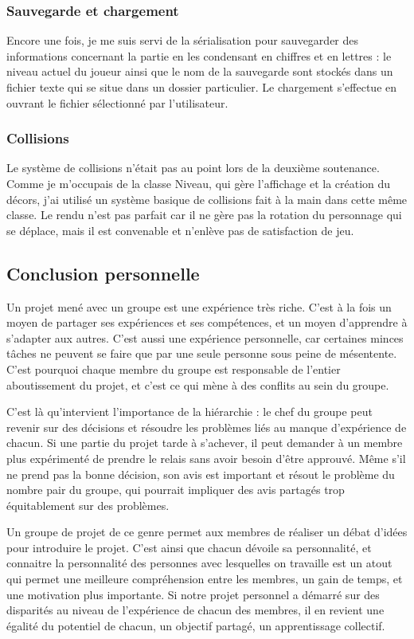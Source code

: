 \documentclass[12pt]{article}
\begin{document}
\subsubsection {Sauvegarde et chargement} 
Encore une fois, je me suis servi de la sérialisation pour sauvegarder des informations concernant la partie en les condensant en chiffres et en lettres : le niveau actuel du joueur ainsi que le nom de la sauvegarde sont stockés dans un fichier texte qui se situe dans un dossier particulier. Le chargement s'effectue en ouvrant le fichier sélectionné par l'utilisateur. 

\subsubsection {Collisions} 
Le système de collisions n'était pas au point lors de la deuxième soutenance. Comme je m'occupais de la classe Niveau, qui gère l'affichage et la création du décors, j'ai utilisé un système basique de collisions fait à la main dans cette même classe. Le rendu n'est pas parfait car il ne gère pas la rotation du personnage qui se déplace, mais il est convenable et n'enlève pas de satisfaction de jeu.

\subsection{Conclusion personnelle}
Un projet mené avec un groupe est une expérience très riche. C'est à la fois un moyen de partager ses expériences et ses compétences, et un moyen d'apprendre à s'adapter aux autres. C'est aussi une expérience personnelle, car certaines minces tâches ne peuvent  se faire que par une seule personne sous peine de mésentente. C'est pourquoi chaque membre du groupe est responsable de l'entier aboutissement du projet, et c'est ce qui mène à des conflits au sein du groupe. 

\par
C'est là qu'intervient l'importance de la hiérarchie : le chef du groupe peut revenir sur des décisions et résoudre les problèmes liés au manque d'expérience de chacun. Si une partie du projet tarde à s'achever, il peut demander à un membre plus expérimenté de prendre le relais sans avoir besoin d'être approuvé. Même s'il ne prend pas la bonne décision, son avis est important et résout le problème du nombre pair du groupe, qui pourrait impliquer des avis partagés trop équitablement sur des problèmes. 

\par
Un groupe de projet de ce genre permet aux membres de réaliser un débat d'idées pour introduire le projet. C'est ainsi que chacun dévoile sa personnalité, et connaitre la personnalité des personnes avec lesquelles on travaille est un atout qui permet une meilleure compréhension entre les membres, un gain de temps, et une motivation plus  importante. Si notre projet personnel a démarré sur des disparités au niveau de l'expérience de chacun des membres, il en revient une égalité du potentiel de chacun, un objectif partagé, un apprentissage collectif.
\end{document}
